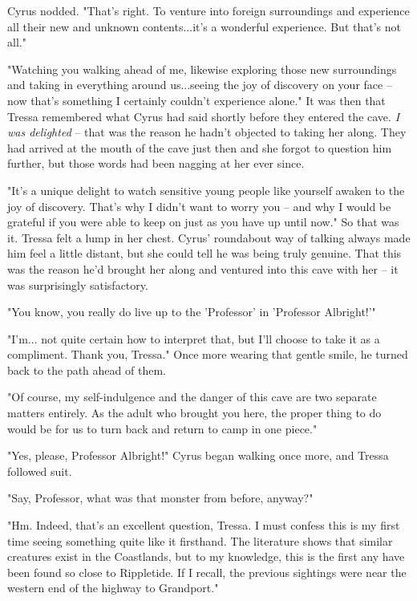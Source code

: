 Cyrus nodded. "That's right. To venture into foreign surroundings and experience all their new and unknown contents...it's a wonderful experience. But that's not all."

"Watching you walking ahead of me, likewise exploring those new surroundings and taking in everything around us...seeing the joy of discovery on your face -- now that's something I certainly couldn't experience alone." It was then that Tressa remembered what Cyrus had said shortly before they entered the cave. \emph{I was delighted} -- that was the reason he hadn't objected to taking her along. They had arrived at the mouth of the cave just then and she forgot to question him further, but those words had been nagging at her ever since.

"It's a unique delight to watch sensitive young people like yourself awaken to the joy of discovery. That's why I didn't want to worry you -- and why I would be grateful if you were able to keep on just as you have up until now." So that was it. Tressa felt a lump in her chest. Cyrus' roundabout way of talking always made him feel a little distant, but she could tell he was being truly genuine. That this was the reason he'd brought her along and ventured into this cave with her -- it was surprisingly satisfactory.

"You know, you really do live up to the 'Professor' in 'Professor Albright!'"

"I'm... not quite certain how to interpret that, but I'll choose to take it as a compliment. Thank you, Tressa." Once more wearing that gentle smile, he turned back to the path ahead of them.

"Of course, my self-indulgence and the danger of this cave are two separate matters entirely. As the adult who brought you here, the proper thing to do would be for us to turn back and return to camp in one piece."

"Yes, please, Professor Albright!" Cyrus began walking once more, and Tressa followed suit.

"Say, Professor, what was that monster from before, anyway?"

"Hm. Indeed, that's an excellent question, Tressa. I must confess this is my first time seeing something quite like it firsthand. The literature shows that similar creatures exist in the Coastlands, but to my knowledge, this is the first any have been found so close to Rippletide. If I recall, the previous sightings were near the western end of the highway to Grandport." 

